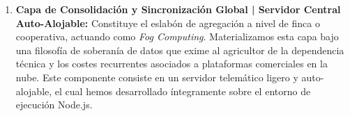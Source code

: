 \begin{enumerate}
\begin{itemize}
        \item \textbf{Pasarela de Sincronización:} Utilizamos la aplicación como puente lógico bidireccional hacia la capa superior de \textit{Fog Computing} conformada por el servidor auto-alojable. Al detectar una conexión estable a Internet, orquestamos la transmisión asíncrona de las series temporales recolectadas hacia la base de datos relacional centralizada, habilitando de esta forma la red de cooperación entre agricultores. Simultáneamente, consultamos y descargamos de manera transparente posibles actualizaciones en las lógicas de nuestros modelos predictivos.
    \end{itemize}
    
    \item \textbf{Capa de Consolidación y Sincronización Global | Servidor Central Auto-Alojable:} Constituye el eslabón de agregación a nivel de finca o cooperativa, actuando como \textit{Fog Computing}. Materializamos esta capa bajo una filosofía de soberanía de datos que exime al agricultor de la dependencia técnica y los costes recurrentes asociados a plataformas comerciales en la nube. Este componente consiste en un servidor telemático ligero y auto-alojable, el cual hemos desarrollado íntegramente sobre el entorno de ejecución Node.js. 


\end{enumerate}
